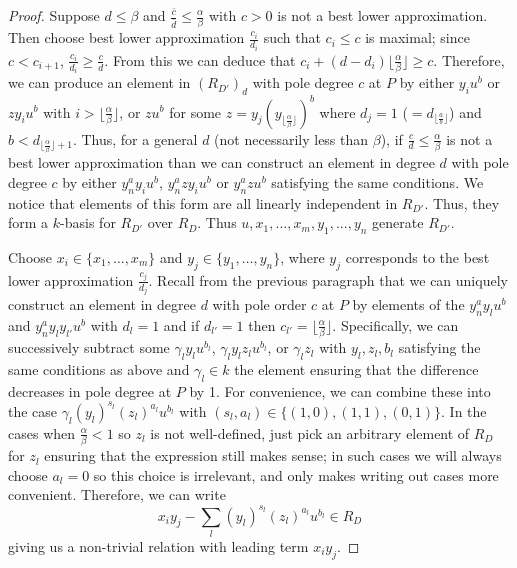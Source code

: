\documentclass{amsart}
\theoremstyle{plain}
\theoremstyle{definition}
\theoremstyle{remark}
\numberwithin{equation}{section}
\begin{document}
\begin{proof}
Suppose $d\le \beta$ and $\frac{\bar{c}}{\bar{d}} \le \frac{\alpha}{
\beta}$ with $c>0$ is not a best lower approximation.  Then choose
best lower approximation $\frac{c_i}{d_i}$ such that $c_i\le c$ is
maximal; since $c<c_{i+1}$, $\frac{c_i}{d_i}\ge \frac{c}{d}$.  From
this we can deduce that $c_i+(d-d_i)\lfloor \frac{\alpha}{\beta}
\rfloor\ge c$.  Therefore, we can produce an element in $(R_{D'})_d$
 with pole degree $c$ at $P$ by either $y_i u^b$ or $z y_i u^b$ with $i>\lfloor \frac{\alpha}{\beta} \rfloor$, or $zu^b$
for some $z=y_j (y_{\lfloor \frac{\alpha}{\beta} \rfloor})^b$ where $d_j=1$ ($=d_{{\lfloor \frac{a}{b} \rfloor}}$) and $b<d_{\lfloor \frac{\alpha}{\beta} \rfloor + 1}$.  Thus, for a
general $d$ (not necessarily less than $\beta$), if $\frac{c}{d} \le
\frac{\alpha}{\beta}$ is not a best lower approximation than we can
construct an element in degree $d$ with pole degree $c$ by either $y
_n^a y_i u^b$, $y_n^a zy_iu^b$ or $y_n^a z u^b$ satisfying the
same conditions.  We notice that elements of this form are all
linearly independent in $R_{D'}$.  Thus, they form a $k$-basis for
$R_{D'}$ over $R_D$.  Thus $u, x_1, ..., x_m, y_1, ..., y_n$ generate
$R_{D'}$.

Choose $x_i\in \{x_1, \ldots, x_m\}$ and $y_j\in \{y_1, \ldots, y_n\}$, where $y_j$ corresponds to the best lower approximation $\frac{c_j}{d_j}$.  Recall from the previous paragraph that we can uniquely construct an element in degree $d$ with pole order $c$ at $P$ by elements of the $y_n^a y_l u^b$ and $y_n^a y_l y_{l'} u^b$ with $d_l=1$ and if $d_{l'}=1$ then $c_{l'} = \lfloor \frac{\alpha}{\beta} \rfloor$.  Specifically, we can successively subtract some $\gamma_l y_l u^{b_l}$, $\gamma_l y_l z_l u^{b_l}$, or $\gamma_l z_l$ with $y_l, z_l, b_l$ satisfying the same conditions as above and $\gamma_l\in k$ the element ensuring that the difference decreases in pole degree at $P$ by 1.  For convenience, we can combine these into the case $\gamma_l (y_l)^{s_l}(z_l)^{a_l}u^{b_l}$ with $(s_l,a_l)\in \{(1,0),(1,1),(0,1)\}$.  In the cases when $\frac{\alpha}{\beta}<1$ so $z_l$ is not well-defined, just pick an arbitrary element of $R_D$ for $z_l$ ensuring that the expression still makes sense; in such cases we will always choose $a_l=0$ so this choice is irrelevant, and only makes writing out cases more convenient.  Therefore, we can write
\[
	x_i y_j - \sum_{l} (y_l)^{s_l} (z_l)^{a_l} u^{b_l}\in R_D
\]
giving us a non-trivial relation with leading term $x_iy_j$. 


\end{proof}
\end{document}
